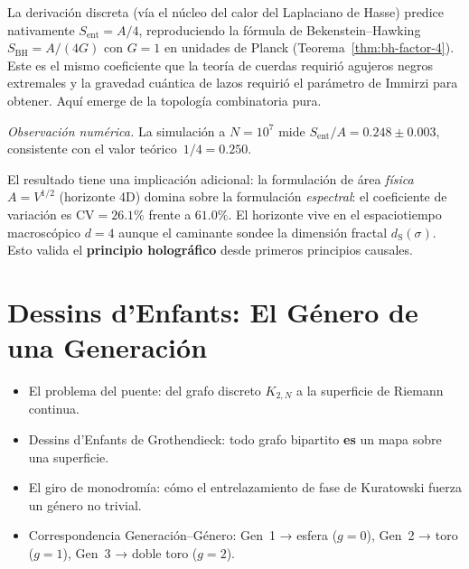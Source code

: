 \documentclass[11pt, a4paper, openany]{book}
\newcommand{\dS}{d_{\mathrm{S}}}
\newenvironment{introduction}[1][Sinopsis del M\'odulo]{%
  \begin{tcolorbox}[
    enhanced,colback=structure!5,colframe=structure,
    colbacktitle=structure,coltitle=white,
    fonttitle=\small\bfseries,title={#1},
    arc=2pt,boxrule=0.7pt,
    left=8pt,right=8pt,top=6pt,bottom=6pt,
    before skip=12pt,after skip=12pt
  ]\itshape\begin{itemize}[leftmargin=*,itemsep=2pt,parsep=0pt]
}{%
  \end{itemize}\end{tcolorbox}
}
\begin{document}
\begin{result}[title={El coeficiente $1/4$ de Bekenstein--Hawking}]
\label{res:bh-factor-4}
La derivaci\'on discreta (v\'ia el n\'ucleo del calor del Laplaciano
de Hasse) predice nativamente $S_{\mathrm{ent}} = A/4$, reproduciendo
la f\'ormula de Bekenstein--Hawking $S_{\mathrm{BH}} = A/(4G)$ con
$G = 1$ en unidades de Planck
(Teorema~\ref{thm:bh-factor-4}). Este es el mismo coeficiente que la
teor\'ia de cuerdas requiri\'o agujeros negros extremales y la
gravedad cu\'antica de lazos requiri\'o el par\'ametro de Immirzi para
obtener. Aqu\'i emerge de la topolog\'ia combinatoria pura.
\end{result}

\noindent\textit{Observaci\'on num\'erica.}\enspace
La simulaci\'on a $N = 10^7$ mide $S_{\mathrm{ent}}/A = 0{.}248
\pm 0{.}003$, consistente con el valor te\'orico~$1/4 = 0{.}250$.

El resultado tiene una implicaci\'on adicional: la formulaci\'on de
\'area \emph{f\'isica} $A = V^{1/2}$ (horizonte 4D) domina sobre la
formulaci\'on \emph{espectral}: el coeficiente de variaci\'on es
$\mathrm{CV} = 26{.}1\%$ frente a $61{.}0\%$. El horizonte vive en
el espaciotiempo macrosc\'opico $d = 4$ aunque el caminante sondee la
dimensi\'on fractal $\dS(\sigma)$. Esto valida el \textbf{principio
hologr\'afico} desde primeros principios causales.


\chapter{Dessins d'Enfants: El Género de una Generación}
\label{ch:dessins}

\begin{introduction}
  \item El problema del puente: del grafo discreto $K_{2,N}$ a la
        superficie de Riemann continua.
  \item Dessins d'Enfants de Grothendieck: todo grafo bipartito
        \textbf{es} un mapa sobre una superficie.
  \item El giro de monodromía: cómo el entrelazamiento de fase de
        Kuratowski fuerza un género no trivial.
  \item Correspondencia Generación–Género: Gen~1 → esfera ($g=0$),
        Gen~2 → toro ($g=1$), Gen~3 → doble toro ($g=2$).
\end{introduction}
\end{document}
